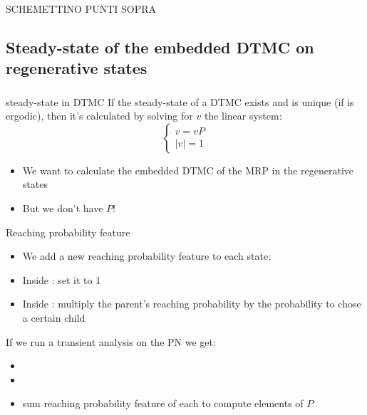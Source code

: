 \begin{frame}
  SCHEMETTINO PUNTI SOPRA
\end{frame}
\subsection{Steady-state of the embedded \acs{DTMC} on regenerative
  states}
\begin{frame}
  \frametitle{\insertsubsection}
  \begin{block}{steady-state in \ac{DTMC}}
    If the steady-state of a \ac{DTMC} exists and is unique (if is
    ergodic), then it's calculated by solving for $v$ the linear
    system:
    \begin{equation*}
      \begin{cases}
        v=vP\\
        |v| = 1
      \end{cases}
    \end{equation*}
  \end{block}
  \pause
  \begin{itemize}
  \item We want to calculate the embedded \ac{DTMC} of the \ac{MRP} in
    the regenerative states
    \pause
  \item But we don't have $P$! 
  \end{itemize}
\end{frame}

\begin{frame}
  \begin{block}{Reaching probability feature}
    \begin{itemize}
    \item We add a new \alert{reaching probability feature} to each
      state: 
    \item Inside : set it to
      1
    \item Inside : multiply the
      parent's reaching probability by the probability to chose a
      certain child
    \end{itemize}
  \end{block}
  If we run a transient analysis on the \ac{PN} we get:
  \begin{itemize}
  \item {}
  \item {\scriptsize{}}
  \item sum reaching probability feature of each  to compute
    elements of \alert{$P$}
  \end{itemize}
\end{frame}

